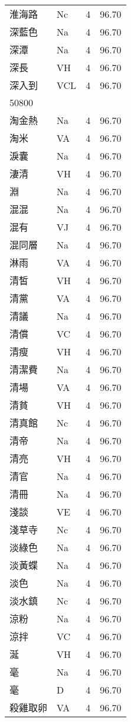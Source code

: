 \documentclass[twocolumn]{book}
\begin{document}
\begin{supertabular}{llrr}
淮海路 & Nc & 4 &  96.70\\
深藍色 & Na & 4 &  96.70\\
深潭 & Na & 4 &  96.70\\
深長 & VH & 4 &  96.70\\
深入到 & VCL & 4 &  96.70\\
50800\\
淘金熱 & Na & 4 &  96.70\\
淘米 & VA & 4 &  96.70\\
淚囊 & Na & 4 &  96.70\\
淒清 & VH & 4 &  96.70\\
淵 & Na & 4 &  96.70\\
混混 & Na & 4 &  96.70\\
混有 & VJ & 4 &  96.70\\
混同層 & Na & 4 &  96.70\\
淋雨 & VA & 4 &  96.70\\
清皙 & VH & 4 &  96.70\\
清黨 & VA & 4 &  96.70\\
清議 & Na & 4 &  96.70\\
清償 & VC & 4 &  96.70\\
清瘦 & VH & 4 &  96.70\\
清潔費 & Na & 4 &  96.70\\
清場 & VA & 4 &  96.70\\
清貧 & VH & 4 &  96.70\\
清真館 & Nc & 4 &  96.70\\
清帝 & Na & 4 &  96.70\\
清亮 & VH & 4 &  96.70\\
清官 & Na & 4 &  96.70\\
清冊 & Na & 4 &  96.70\\
淺談 & VE & 4 &  96.70\\
淺草寺 & Nc & 4 &  96.70\\
淡綠色 & Na & 4 &  96.70\\
淡黃蝶 & Na & 4 &  96.70\\
淡色 & Na & 4 &  96.70\\
淡水鎮 & Nc & 4 &  96.70\\
涼粉 & Na & 4 &  96.70\\
涼拌 & VC & 4 &  96.70\\
涎 & VH & 4 &  96.70\\
毫 & Na & 4 &  96.70\\
毫 & D & 4 &  96.70\\
殺雞取卵 & VA & 4 &  96.70\\

\end{supertabular}
\end{document}
